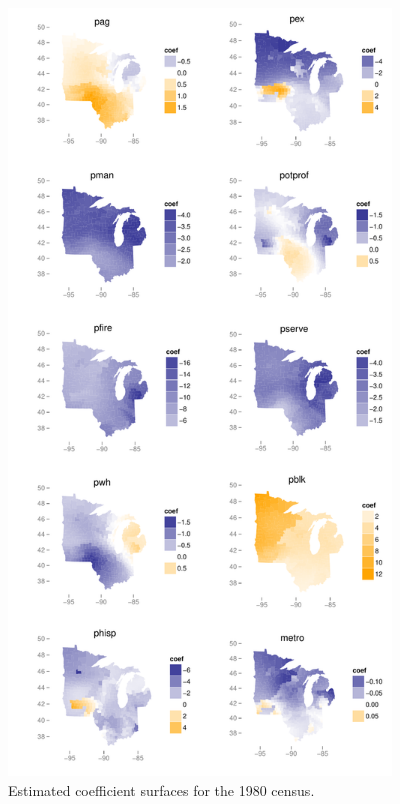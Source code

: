 	\begin{figure}
		\begin{center}
			\includegraphics[height=8in]{../../figures/poverty/1980.linear.coefficients.pdf}
			\caption{Estimated coefficient surfaces for the 1980 census.\label{fig:census-coefs-1980}}
		\end{center}
	\end{figure}
	

